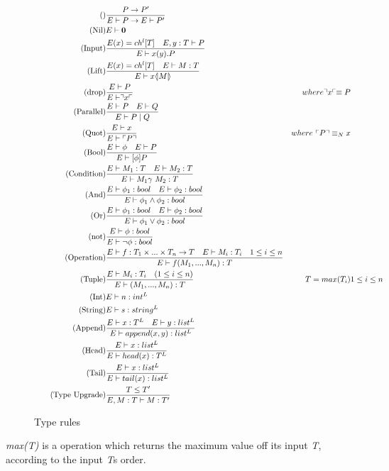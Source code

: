 \begin{figure}
\begin{align}
\tag{} & \frac{P\rightarrow P'}{E\vdash P \rightarrow E\vdash P'}\\
\tag{Nil} &E \vdash \mathbf{0}\\
\tag{Input} &\frac{E(x) = ch^l[T]\quad E,y:T\vdash P}{E \vdash x(y).P}\\
\tag{Lift} &\frac{E(x) = ch^l[T] \quad E \vdash M:T}{E\vdash x \langle \! | M | \! \rangle}\\
\tag{drop} &\frac{E \vdash P}{E\vdash \urcorner x \ulcorner}& where \urcorner x \ulcorner \equiv P\\
\tag{Parallel} &\frac{E\vdash P \quad E \vdash Q}{E \vdash P \mid Q}\\
\tag{Quot} &\frac{E \vdash x}{E\vdash \ulcorner P \urcorner}& where\ \ulcorner P \urcorner \equiv_N x\\
\tag{Bool} &\frac{E\vdash \phi \quad E\vdash P}{E \vdash [\phi] P}\\
\tag{Condition} &\frac{E\vdash M_1:T \quad E\vdash M_2:T}{E\vdash M_1 \gamma\ M_2:T}\\
\tag{And} &\frac{E\vdash \phi _1:bool \quad E\vdash \phi _2:bool}{E\vdash \phi _1 \land \phi _2:bool}\\
\tag{Or} &\frac{E\vdash \phi _1:bool \quad E\vdash \phi _2:bool}{E\vdash \phi _1 \lor \phi _2:bool}\\
\tag{not} &\frac{E\vdash \phi :bool }{E\vdash \neg \phi :bool}\\
\tag{Operation} &\frac{E\vdash f:T_1\times ... \times T_n\rightarrow T\quad E\vdash M_i:T_i\quad 1\leq i \leq n}{E\vdash f(M_1,...,M_n):T}\\
\tag{Tuple} &\frac{E\vdash M_i:T_i \quad (1\leq i\leq n)}{E\vdash (M_1,...,M_n):T}&T = max(T_i)& 1\leq i\leq n\\
\tag{Int} &E\vdash n: int^L\\
\tag{String} &E\vdash s:string^L\\
\tag{Append} &\frac{E \vdash x:T^L \quad E \vdash y:list^L}{E \vdash append(x,y):list^L}\\
\tag{Head} &\frac{E \vdash x:list^L}{E \vdash head(x):T^L}\\
\tag{Tail} &\frac{E \vdash x:list^L}{E \vdash tail(x):list^L}\\
\tag{Type Upgrade} &\frac{T\leq T'}{E, M:T\vdash M:T'}
\end{align}
\caption{Type rules}
\label{fig:typerules}
\end{figure}

\textit{max(T)} is a operation which returns the maximum value off its input \textit{T}, according to the input \textit{T}s order.

%
%

\FloatBarrier
